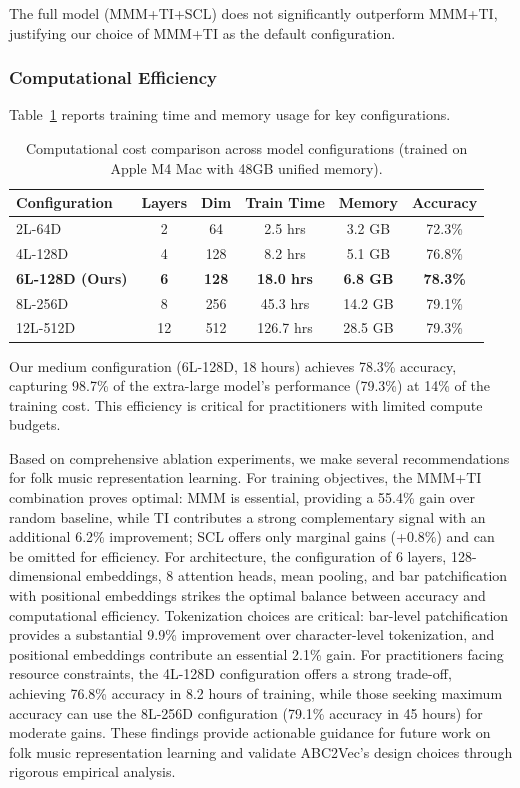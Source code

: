 \documentclass[]{interact}
\theoremstyle{plain}
\theoremstyle{definition}
\theoremstyle{remark}
\begin{document}
The full model (MMM+TI+SCL) does not significantly outperform MMM+TI, justifying our choice of MMM+TI as the default configuration.

\subsubsection{Computational Efficiency}

Table~\ref{tab:compute_cost} reports training time and memory usage for key configurations.

\begin{table}[!htb]
\centering
\caption{Computational cost comparison across model configurations (trained on Apple M4 Mac with 48GB unified memory).}
\label{tab:compute_cost}
\begin{tabular}{lccccc}
\toprule
\textbf{Configuration} & \textbf{Layers} & \textbf{Dim} & \textbf{Train Time} & \textbf{Memory} & \textbf{Accuracy} \\
\midrule
2L-64D & 2 & 64 & 2.5 hrs & 3.2 GB & 72.3\% \\
4L-128D & 4 & 128 & 8.2 hrs & 5.1 GB & 76.8\% \\
\textbf{6L-128D (Ours)} & \textbf{6} & \textbf{128} & \textbf{18.0 hrs} & \textbf{6.8 GB} & \textbf{78.3\%} \\
8L-256D & 8 & 256 & 45.3 hrs & 14.2 GB & 79.1\% \\
12L-512D & 12 & 512 & 126.7 hrs & 28.5 GB & 79.3\% \\
\bottomrule
\end{tabular}
\end{table}

Our medium configuration (6L-128D, 18 hours) achieves 78.3\% accuracy, capturing 98.7\% of the extra-large model's performance (79.3\%) at 14\% of the training cost. This efficiency is critical for practitioners with limited compute budgets.

Based on comprehensive ablation experiments, we make several recommendations for folk music representation learning. For training objectives, the MMM+TI combination proves optimal: MMM is essential, providing a 55.4\% gain over random baseline, while TI contributes a strong complementary signal with an additional 6.2\% improvement; SCL offers only marginal gains (+0.8\%) and can be omitted for efficiency. For architecture, the configuration of 6 layers, 128-dimensional embeddings, 8 attention heads, mean pooling, and bar patchification with positional embeddings strikes the optimal balance between accuracy and computational efficiency. Tokenization choices are critical: bar-level patchification provides a substantial 9.9\% improvement over character-level tokenization, and positional embeddings contribute an essential 2.1\% gain. For practitioners facing resource constraints, the 4L-128D configuration offers a strong trade-off, achieving 76.8\% accuracy in 8.2 hours of training, while those seeking maximum accuracy can use the 8L-256D configuration (79.1\% accuracy in 45 hours) for moderate gains. These findings provide actionable guidance for future work on folk music representation learning and validate ABC2Vec's design choices through rigorous empirical analysis.
\end{document}

